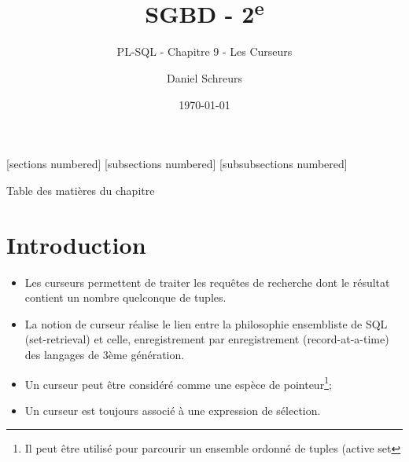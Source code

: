 \documentclass[10pt]{beamer}
\title{SGBD - 2\textsuperscript{e}}
\subtitle{PL-SQL - Chapitre 9 - Les Curseurs}
\date{\today}
\author{Daniel Schreurs}
\institute{Haute École de la Province de Liège}
\begin{document}
\maketitle

[sections numbered]
[subsections numbered]
[subsubsections numbered]
\begin{frame}[allowframebreaks]{Table des matières du chapitre}
    \tableofcontents[subsectionstyle=show/show/hide,subsubsectionstyle=show/show/hide,]
\end{frame}

\section{Introduction}
\begin{frame}{\secname}
    \begin{itemize}
        \item Les curseurs permettent de traiter les requêtes de recherche dont le résultat contient un nombre quelconque de tuples.
        \item La notion de curseur réalise le lien entre la philosophie ensembliste de SQL (set-retrieval) et celle, enregistrement par enregistrement (record-at-a-time) des langages de 3ème génération.
    \end{itemize}
\end{frame}

\begin{frame}{\secname}
    \begin{itemize}
        \item Un curseur peut être considéré comme une espèce de pointeur\footnote{Il peut être utilisé pour parcourir un ensemble ordonné de tuples (active set};
        \item Un curseur est toujours associé à une expression de sélection.
    \end{itemize}
\end{frame}

\begin{frame}{\secname}
    
\end{frame}
\end{document}
